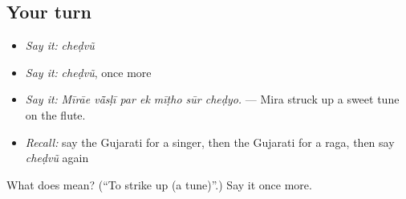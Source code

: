 \subsection*{Your turn}
\begin{itemize}
\raggedright
  \item \emph{Say it:} \emph{cheḍvũ}
  \item \emph{Say it:} \emph{cheḍvũ}, once more
  \item \emph{Say it:} \emph{Mīrāe vā̃sḷī par ek mīṭho sūr cheḍyo.} — Mira struck up a sweet tune on the flute.
  \item \emph{Recall:} say the Gujarati for a singer, then the Gujarati for a raga, then say \emph{cheḍvũ} again
\end{itemize}

\begin{tcolorbox}[breakable,colback=teal!4,colframe=teal!35!black,title={Before you move on}]
What does  mean? (\textquotedblleft{}To strike up (a tune)\textquotedblright{}.) Say it once more.
\end{tcolorbox}
